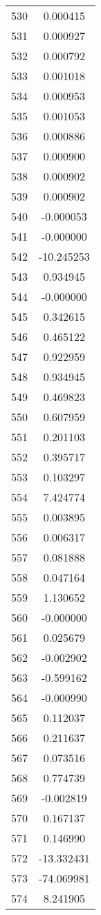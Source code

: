 \documentclass[12pt]{article}
\begin{document}
\begin{longtable}{@{}cc@{}}
530 & 0.000415 \\
531 & 0.000927 \\
532 & 0.000792 \\
533 & 0.001018 \\
534 & 0.000953 \\
535 & 0.001053 \\
536 & 0.000886 \\
537 & 0.000900 \\
538 & 0.000902 \\
539 & 0.000902 \\
540 & -0.000053 \\
541 & -0.000000 \\
542 & -10.245253 \\
543 & 0.934945 \\
544 & -0.000000 \\
545 & 0.342615 \\
546 & 0.465122 \\
547 & 0.922959 \\
548 & 0.934945 \\
549 & 0.469823 \\
550 & 0.607959 \\
551 & 0.201103 \\
552 & 0.395717 \\
553 & 0.103297 \\
554 & 7.424774 \\
555 & 0.003895 \\
556 & 0.006317 \\
557 & 0.081888 \\
558 & 0.047164 \\
559 & 1.130652 \\
560 & -0.000000 \\
561 & 0.025679 \\
562 & -0.002902 \\
563 & -0.599162 \\
564 & -0.000990 \\
565 & 0.112037 \\
566 & 0.211637 \\
567 & 0.073516 \\
568 & 0.774739 \\
569 & -0.002819 \\
570 & 0.167137 \\
571 & 0.146990 \\
572 & -13.332431 \\
573 & -74.069981 \\
574 & 8.241905 \\

\end{longtable}
\end{document}
